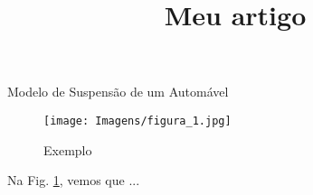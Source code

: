 \documentclass[a4paper,12pt]{article}
\title{Meu artigo}
\begin{document}
\begin{center}
    Modelo de Suspensão de um Automável
    
\end{center}

\maketitle

\begin{figure}[h]
    \caption{Exemplo}
    
    \centering %
    \texttt{[image: Imagens/figura\_1.jpg]} %
    \label{figura:qualquernome}
    \end{figure}
    
    Na Fig. \ref{figura:qualquernome}, vemos que ...
\end{document}

